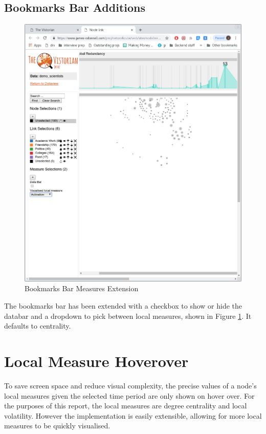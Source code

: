 \subsection{Bookmarks Bar Additions}
\begin{figure}
  \begin{center}
  \includegraphics[trim={0, 12cm, 20cm, 22cm},clip, width=140mm]{./Figures/bookmarksbar.png}
  \caption{Bookmarks Bar Measures Extension}
  \label{fig:bookmarksbar}
  \end{center}
\end{figure}

The bookmarks bar has been extended with a checkbox to show or hide the databar and a dropdown to pick between local measures, shown in Figure \ref{fig:bookmarksbar}. It defaults to centrality.

\section{Local Measure Hoverover}
\label{sec:localMeasureVis}
To save screen space and reduce visual complexity, the precise values of a node's local measures given the selected time period are only shown on hover over. For the purposes of this report, the local measures are degree centrality and local volatility. However the implementation is easily extensible, allowing for more local measures to be quickly visualised.

